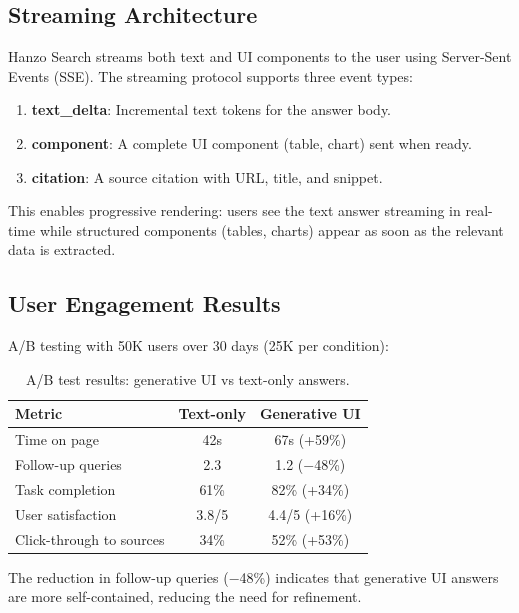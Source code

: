 \documentclass[11pt,twocolumn]{article}
\begin{document}
\subsection{Streaming Architecture}

Hanzo Search streams both text and UI components to the user using Server-Sent Events (SSE). The streaming protocol supports three event types:

\begin{enumerate}[leftmargin=1.4em]
    \item \textbf{text\_delta}: Incremental text tokens for the answer body.
    \item \textbf{component}: A complete UI component (table, chart) sent when ready.
    \item \textbf{citation}: A source citation with URL, title, and snippet.
\end{enumerate}

This enables progressive rendering: users see the text answer streaming in real-time while structured components (tables, charts) appear as soon as the relevant data is extracted.

\subsection{User Engagement Results}

A/B testing with 50K users over 30 days (25K per condition):

\begin{table}[H]
\centering
\small
\begin{tabular}{lcc}
\toprule
\textbf{Metric} & \textbf{Text-only} & \textbf{Generative UI} \\
\midrule
Time on page & 42s & 67s (+59\%) \\
Follow-up queries & 2.3 & 1.2 ($-$48\%) \\
Task completion & 61\% & 82\% (+34\%) \\
User satisfaction & 3.8/5 & 4.4/5 (+16\%) \\
Click-through to sources & 34\% & 52\% (+53\%) \\
\bottomrule
\end{tabular}
\caption{A/B test results: generative UI vs text-only answers.}
\label{tab:ab_test}
\end{table}

The reduction in follow-up queries ($-$48\%) indicates that generative UI answers are more self-contained, reducing the need for refinement.
\end{document}

